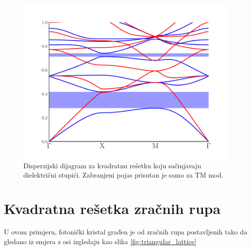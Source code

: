 \documentclass[utf8, seminar, numeric]{fer}
\begin{document}
\begin{figure}[ht]
	\centering
	\includegraphics[width = 0.8\linewidth]
		{./images/pdf/square_lattice_rods_band_diagram.pdf}
	\caption{Disperzijski dijagram za kvadratnu rešetku koju sačinjavaju
	dielektrični stupići. Zabranjeni pojas prisutan je samo za TM mod.}
	\label{fig:square_band_diagram}
\end{figure}

\FloatBarrier

\section{Kvadratna rešetka zračnih rupa} \label{sec:square_holes}

U ovom primjeru, fotonički kristal građen je od zračnih rupa
postavljenih tako da gledano iz smjera z osi izgledaju kao
slika \ref{fig:triangular_lattice}
\end{document}
